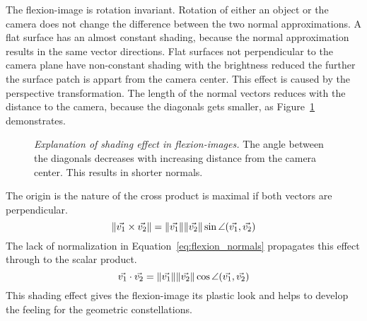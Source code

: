 The \gls{flexion-image} is rotation invariant.
Rotation of either an object or the camera does not change the difference between the two normal approximations.
A flat surface has an almost constant shading, because the normal approximation results in the same vector directions.
Flat surfaces not perpendicular to the camera plane have non-constant shading with the brightness reduced the further the surface patch is appart from the camera center.
This effect is caused by the perspective transformation.
The length of the normal vectors reduces with the distance to the camera, because the diagonals gets smaller, as Figure~\ref{fig:flexion_angle_decrease} demonstrates.
\begin{figure}[H]
    
    \caption[Explanation of shading effect in \glspl{flexion-image}]{\emph{Explanation of shading effect in \glspl{flexion-image}.} The angle between the diagonals decreases with increasing distance from the camera center. This results in shorter normals.}\label{fig:flexion_angle_decrease}
\end{figure}
The origin is the nature of the cross product is maximal if both vectors are perpendicular.
\begin{equation*}
    \lVert\vec{v_1} \times \vec{v_2}\rVert = \lVert\vec{v_1}\rVert \lVert\vec{v_2}\rVert \sin \angle(\vec{v_1}, \vec{v_2})
\end{equation*}
The lack of normalization in Equation~\ref{eq:flexion_normals} propagates this effect through to the scalar product.
\begin{equation*}
    \vec{v_1} \cdot \vec{v_2} = \lVert\vec{v_1}\rVert \lVert\vec{v_2}\rVert \cos \angle(\vec{v_1}, \vec{v_2})
\end{equation*}
This shading effect gives the \gls{flexion-image} its plastic look and helps to develop the feeling for the geometric constellations.
